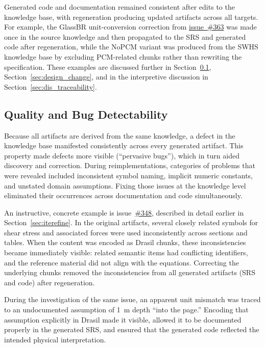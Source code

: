 Generated code and documentation remained consistent after edits to the
knowledge base, with regeneration producing updated artifacts across all 
targets. For example, the GlassBR unit-conversion correction from 
\href{https://github.com/JacquesCarette/Drasil/issues/363}{issue~\#363}
was made once in the source knowledge and then propagated to the SRS and 
generated code after regeneration, while the NoPCM variant was produced from 
the SWHS knowledge base by excluding PCM-related chunks rather than rewriting 
the specification. These examples are discussed further in 
Section~\ref{sec:quality}, Section~\ref{sec:design_change}, and in the 
interpretive discussion in Section~\ref{sec:dis_traceability}.

\subsection{Quality and Bug Detectability}
\label{sec:quality}
Because all artifacts are derived from the same knowledge, a defect in the
knowledge base manifested consistently across every generated artifact. This
property made defects more visible (``pervasive bugs''), which in turn aided
discovery and correction. During reimplementations, categories of problems
that were revealed included inconsistent symbol naming, implicit numeric
constants, and unstated domain assumptions. Fixing those issues at the
knowledge level eliminated their occurrences across documentation and code
simultaneously.

An instructive, concrete example is
issue~\href{https://github.com/JacquesCarette/Drasil/issues/348}{\#348},
described in detail earlier in Section~\ref{sec:iterefine}. In the original
\sp{} artifacts, several closely related symbols for shear stress and
associated forces were used inconsistently across sections and tables. When
the \sp{} content was encoded as Drasil chunks, these inconsistencies became
immediately visible: related semantic items had conflicting identifiers, and
the reference material did not align with the equations. Correcting the
underlying chunks removed the inconsistencies from all generated artifacts
(SRS and code) after regeneration.

During the investigation of the same issue, an apparent unit mismatch was
traced to an undocumented assumption of 1~m depth ``into the page.''
Encoding that assumption explicitly in Drasil made it visible, allowed it to
be documented properly in the generated SRS, and ensured that the generated
code reflected the intended physical interpretation.

